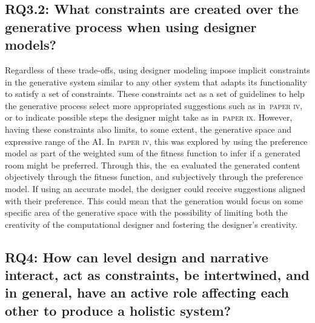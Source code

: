 \subsection[Research Question 3.2]{RQ3.2: What constraints are created over the generative process when using designer models?}

Regardless of these trade-offs, using designer modeling impose implicit constraints in the generative system similar to any other system that adapts its functionality to satisfy a set of constraints. These constraints act as a set of guidelines to help the generative process select more appropriated suggestions such as in~\textsc{paper iv}, or to indicate possible steps the designer might take as in~\textsc{paper ix}. However, having these constraints also limits, to some extent, the generative space and expressive range of the AI. In~\textsc{paper iv}, this was explored by using the preference model as part of the weighted sum of the fitness function to infer if a generated room might be preferred. Through this, the~\acrshort{ea} evaluated the generated content objectively through the fitness function, and subjectively through the preference model. If using an accurate model, the designer could receive suggestions aligned with their preference. This could mean that the generation would focus on some specific area of the generative space with the possibility of limiting both the creativity of the computational designer and fostering the designer's creativity.

\subsection[Research Question 4]{RQ4: How can level design and narrative interact, act as constraints, be intertwined, and in general, have an active role affecting each other to produce a holistic system?  }



